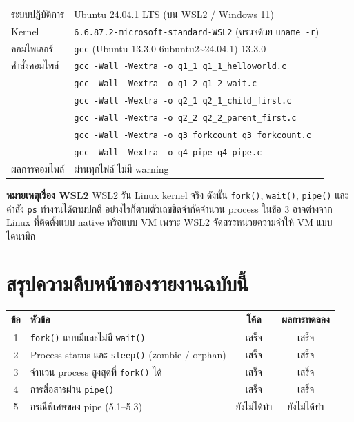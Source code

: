 \documentclass[a4paper,12pt]{article}
\newcommand{\code}[1]{\texttt{#1}}
\begin{document}
\begin{tabular}{ll}
\toprule
ระบบปฏิบัติการ & Ubuntu 24.04.1 LTS (บน WSL2 / Windows 11) \\
Kernel & \code{6.6.87.2-microsoft-standard-WSL2} (ตรวจด้วย \code{uname -r}) \\
คอมไพเลอร์ & \code{gcc} (Ubuntu 13.3.0-6ubuntu2\textasciitilde24.04.1) 13.3.0 \\
คำสั่งคอมไพล์ & \code{gcc -Wall -Wextra -o q1\_1 q1\_1\_helloworld.c} \\
 & \code{gcc -Wall -Wextra -o q1\_2 q1\_2\_wait.c} \\
 & \code{gcc -Wall -Wextra -o q2\_1 q2\_1\_child\_first.c} \\
 & \code{gcc -Wall -Wextra -o q2\_2 q2\_2\_parent\_first.c} \\
 & \code{gcc -Wall -Wextra -o q3\_forkcount q3\_forkcount.c} \\
 & \code{gcc -Wall -Wextra -o q4\_pipe q4\_pipe.c} \\
ผลการคอมไพล์ & ผ่านทุกไฟล์ ไม่มี warning \\
\bottomrule
\end{tabular}

\vspace{1em}

\textbf{หมายเหตุเรื่อง WSL2} \quad WSL2 รัน Linux kernel จริง ดังนั้น \code{fork()}, \code{wait()},
\code{pipe()} และคำสั่ง \code{ps} ทำงานได้ตามปกติ อย่างไรก็ตามตัวเลขขีดจำกัดจำนวน process ในข้อ 3
อาจต่างจาก Linux ที่ติดตั้งแบบ native หรือแบบ VM เพราะ WSL2 จัดสรรหน่วยความจำให้ VM แบบไดนามิก

\newpage

\section*{สรุปความคืบหน้าของรายงานฉบับนี้}

\begin{table}[H]
\centering
\begin{tabular}{clcc}
\toprule
\textbf{ข้อ} & \textbf{หัวข้อ} & \textbf{โค้ด} & \textbf{ผลการทดลอง} \\
\midrule
1 & \code{fork()} แบบมีและไม่มี \code{wait()} & เสร็จ & เสร็จ \\
2 & Process status และ \code{sleep()} (zombie / orphan) & เสร็จ & เสร็จ \\
3 & จำนวน process สูงสุดที่ \code{fork()} ได้ & เสร็จ & เสร็จ \\
4 & การสื่อสารผ่าน \code{pipe()} & เสร็จ & เสร็จ \\
5 & กรณีพิเศษของ pipe (5.1--5.3) & ยังไม่ได้ทำ & ยังไม่ได้ทำ \\
\bottomrule
\end{tabular}
\end{table}
\end{document}
